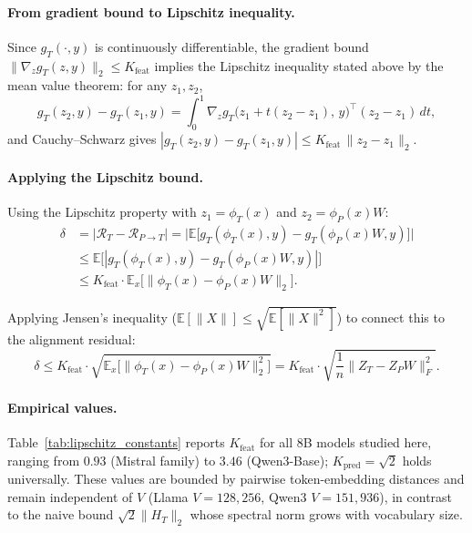 \paragraph{From gradient bound to Lipschitz inequality.}
Since $g_T(\cdot, y)$ is continuously differentiable, the gradient bound $\|\nabla_z g_T(z, y)\|_2 \le K_{\mathrm{feat}}$ implies the Lipschitz inequality stated above by the mean value theorem: for any $z_1, z_2$,
\begin{equation*}
g_T(z_2, y) - g_T(z_1, y) = \int_0^1 \nabla_z g_T\!\big(z_1 + t(z_2 - z_1),\, y\big)^\top (z_2 - z_1)\, dt,
\end{equation*}
and Cauchy--Schwarz gives $|g_T(z_2, y) - g_T(z_1, y)| \le K_{\mathrm{feat}}\, \|z_2 - z_1\|_2$.

\paragraph{Applying the Lipschitz bound.}
Using the Lipschitz property with $z_1 = \phi_T(x)$ and $z_2 = \phi_P(x) W$:
\begin{equation}
\begin{aligned}
\delta &= \big|\mathcal{R}_T - \mathcal{R}_{P \to T}\big| = \Big|\mathbb{E}\big[g_T(\phi_T(x), y) - g_T(\phi_P(x) W, y)\big]\Big| \\
&\le \mathbb{E}\Big[|g_T(\phi_T(x), y) - g_T(\phi_P(x) W, y)|\Big] \\
&\le K_{\mathrm{feat}} \cdot \mathbb{E}_x\!\big[\|\phi_T(x) - \phi_P(x) W\|_2\big].
\end{aligned}
\end{equation}

Applying Jensen's inequality ($\mathbb{E}[\|X\|] \le \sqrt{\mathbb{E}[\|X\|^2]}$) to connect this to the alignment residual:
\begin{equation}
\label{eq:delta_lipschitz}
\delta \le K_{\mathrm{feat}} \cdot \sqrt{\mathbb{E}_x\!\big[\|\phi_T(x) - \phi_P(x) W\|_2^2\big]} = K_{\mathrm{feat}} \cdot \sqrt{\frac{1}{n}\|Z_T - Z_P W\|_F^2}.
\end{equation}

\paragraph{Empirical values.} Table~\ref{tab:lipschitz_constants} reports $K_{\mathrm{feat}}$ for all 8B models studied here, ranging from $0.93$ (Mistral family) to $3.46$ (Qwen3-Base); $K_{\mathrm{pred}}=\sqrt{2}$ holds universally. These values are bounded by pairwise token-embedding distances and remain independent of $V$ (Llama $V{=}128{,}256$, Qwen3 $V{=}151{,}936$), in contrast to the naive bound $\sqrt{2}\|H_T\|_2$ whose spectral norm grows with vocabulary size.


